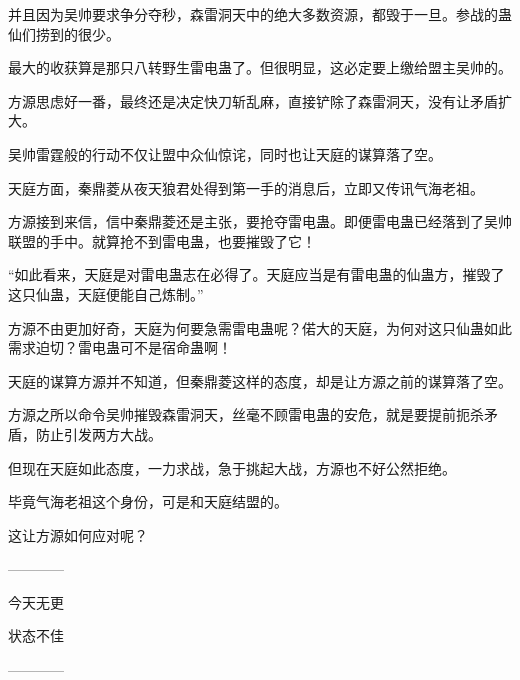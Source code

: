 \begin{this_body}
并且因为吴帅要求争分夺秒，森雷洞天中的绝大多数资源，都毁于一旦。参战的蛊仙们捞到的很少。

最大的收获算是那只八转野生雷电蛊了。但很明显，这必定要上缴给盟主吴帅的。

方源思虑好一番，最终还是决定快刀斩乱麻，直接铲除了森雷洞天，没有让矛盾扩大。

吴帅雷霆般的行动不仅让盟中众仙惊诧，同时也让天庭的谋算落了空。

天庭方面，秦鼎菱从夜天狼君处得到第一手的消息后，立即又传讯气海老祖。

方源接到来信，信中秦鼎菱还是主张，要抢夺雷电蛊。即便雷电蛊已经落到了吴帅联盟的手中。就算抢不到雷电蛊，也要摧毁了它！

“如此看来，天庭是对雷电蛊志在必得了。天庭应当是有雷电蛊的仙蛊方，摧毁了这只仙蛊，天庭便能自己炼制。”

方源不由更加好奇，天庭为何要急需雷电蛊呢？偌大的天庭，为何对这只仙蛊如此需求迫切？雷电蛊可不是宿命蛊啊！

天庭的谋算方源并不知道，但秦鼎菱这样的态度，却是让方源之前的谋算落了空。

方源之所以命令吴帅摧毁森雷洞天，丝毫不顾雷电蛊的安危，就是要提前扼杀矛盾，防止引发两方大战。

但现在天庭如此态度，一力求战，急于挑起大战，方源也不好公然拒绝。

毕竟气海老祖这个身份，可是和天庭结盟的。

这让方源如何应对呢？

------------

今天无更

状态不佳

------------

\end{this_body}

